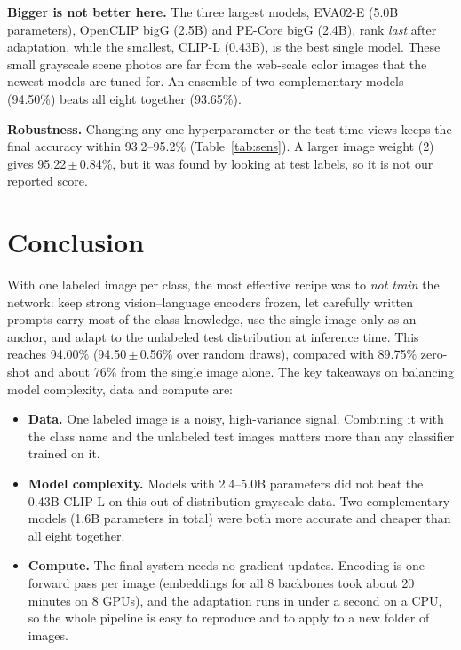 \documentclass[10pt]{article}
\begin{document}
\textbf{Bigger is not better here.} The three largest models, EVA02-E (5.0B parameters), OpenCLIP bigG (2.5B) and PE-Core bigG (2.4B), rank \emph{last} after adaptation, while the smallest, CLIP-L (0.43B), is the best single model.
These small grayscale scene photos are far from the web-scale color images that the newest models are tuned for.
An ensemble of two complementary models (94.50\%) beats all eight together (93.65\%).

\textbf{Robustness.} Changing any one hyperparameter or the test-time views keeps the final accuracy within 93.2--95.2\% (Table~\ref{tab:sens}).
A larger image weight (2) gives 95.22\,$\pm$\,0.84\%, but it was found by looking at test labels, so it is not our reported score.

\section{Conclusion}
With one labeled image per class, the most effective recipe was to \emph{not train} the network: keep strong vision--language encoders frozen, let carefully written prompts carry most of the class knowledge, use the single image only as an anchor, and adapt to the unlabeled test distribution at inference time.
This reaches 94.00\% (94.50\,$\pm$\,0.56\% over random draws), compared with 89.75\% zero-shot and about 76\% from the single image alone.
The key takeaways on balancing model complexity, data and compute are:
\begin{itemize}
\item \textbf{Data.} One labeled image is a noisy, high-variance signal. Combining it with the class name and the unlabeled test images matters more than any classifier trained on it.
\item \textbf{Model complexity.} Models with 2.4--5.0B parameters did not beat the 0.43B CLIP-L on this out-of-distribution grayscale data. Two complementary models (1.6B parameters in total) were both more accurate and cheaper than all eight together.
\item \textbf{Compute.} The final system needs no gradient updates. Encoding is one forward pass per image (embeddings for all 8 backbones took about 20 minutes on 8 GPUs), and the adaptation runs in under a second on a CPU, so the whole pipeline is easy to reproduce and to apply to a new folder of images.
\end{itemize}
\end{document}
